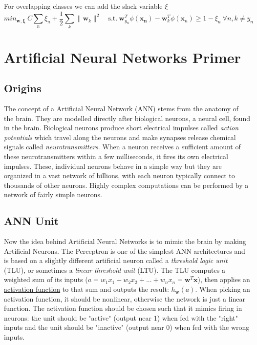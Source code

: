 \documentclass[12pt]{article}
\begin{document}
            For overlapping classes we can add the slack variable $\xi$
            $$ min_{\boldsymbol{w}, \boldsymbol{\xi}} \ C \sum_n \xi_n + \frac{1}{2} \sum_k \|\boldsymbol{w}_k \|^2 \quad \textrm{s.t.} \
            \boldsymbol{w}^T_{y_n} \phi(\boldsymbol{x_n}) - \boldsymbol{w}^T_k \phi(\boldsymbol{x}_n) \geq 1 - \xi_n \ 
            \forall n,k \neq y_n $$

\section{Artificial Neural Networks Primer} \label{sec:ANN}
    \subsection{Origins}
        The concept of a Artificial Neural Network (ANN) stems from the anatomy of the brain. They are modelled directly
        after biological neurons, a neural cell, found in the brain. Biological neurons produce short electrical
        impulses called \textit{action potentials} which travel along the neurons and make synapses release chemical
        signals called \textit{neurotransmitters}. When a neuron receives a sufficient amount of these neurotransmitters
        within a few milliseconds, it fires its own electrical impulses. These, individual neurons behave in a simple
        way but they are organized in a vast network of billions, with each neuron typically connect to thousands of
        other neurons. Highly complex computations can be performed by a network of fairly simple neurons.

    \subsection{ANN Unit}
        Now the idea behind Artificial Neural Networks is to mimic the brain by making Artificial Neurons. The
        Perceptron is one of the simplest ANN architectures and is based on a slightly different artificial neuron
        called a \textit{threshold logic unit} (TLU), or sometimes a \textit{linear threshold unit} (LTU). The TLU
        computes a weighted sum of its inputs ($a = w_1x_1 + w_2x_2 + ... + w_nx_n = \boldsymbol{w}^T\boldsymbol{x}$),
        then applies an \hyperref[sec:ActivationFunction]{activation function} to that sum and outputs the result:
        $h_{\boldsymbol{w}}(a)$. When picking an activation function, it should be nonlinear, otherwise the network is
        just a linear function. The activation function should be chosen such that it mimics firing in neurons: the unit
        should be "active" (output near 1) when fed with the "right" inputs and the unit should be "inactive" (output
        near 0) when fed with the wrong inputs.
\end{document}
